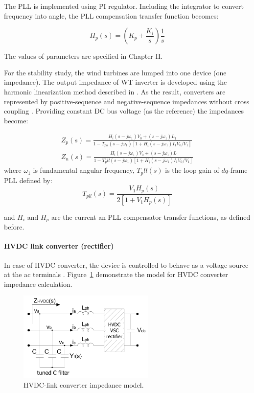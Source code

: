 \documentclass[12pt]{report} %
\begin{document}
The PLL is implemented using PI regulator. Including the integrator to convert frequency into angle, the PLL compensation transfer function becomes:

\begin{equation}
	H_p (s)=\left ( K_p +\dfrac{K_i}{s} \right )\dfrac{1}{s}
\end{equation}

The values of parameters are specified in Chapter II.

For the stability study, the wind turbines are lumped into one device (one impedance). The output impedance of WT inverter is developed using the harmonic linearization method described in \cite{bing2009}. As the result, converters are represented by positive-sequence and negative-sequence impedances without cross coupling \cite{cespedes2014}. Providing constant DC bus voltage (as the reference) the impedances become:

\begin{equation} \label{eq:impedance_wt}
\begin{aligned}
	Z_p (s)=\frac{H_i (s-j\omega_1)V_0 +(s-j\omega_1)L_1 }{1-T_{pll} (s-j\omega_1)[1+H_i (s-j\omega_1)I_1 V_0 /V_1 ]} \\
	Z_n (s)=\frac{H_i (s-j\omega_1)V_0 +(s-j\omega_1)L}{1-T_pll (s-j\omega_1)[1+H_i (s-j\omega_1)I_1 V_0 /V_1 ]}
\end{aligned}
\end{equation}
where $\omega_1$ is fundamental angular frequency, $T_pll (s)$ is the loop gain of $dq$-frame PLL defined by:
\begin{equation}
	T_{pll} (s)=\dfrac{V_1 H_p (s)}{2[1+V_1 H_p (s)]}
\end{equation}

and $H_i$ and $H_p$ are the current an PLL compensator transfer functions, as defined before.

\paragraph{HVDC link converter (rectifier)}
In case of HVDC converter, the device is controlled to behave as a voltage source at the ac terminals \cite{larsen2012}. Figure~\ref{fig:hvdcscheme} demonstrate the model for HVDC converter impedance calculation.

\begin{figure}[htb]
	\centering
    	\includegraphics[width=0.6\textwidth]{img/theory/HVDC_scheme.png}
  	\caption{HVDC-link converter impedance model.}
  	\label{fig:hvdcscheme}
\end{figure}
\FloatBarrier
\end{document}
